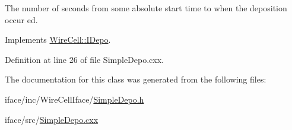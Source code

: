 The number of seconds from some absolute start time to when the deposition occur ed. 

Implements \hyperlink{class_wire_cell_1_1_i_depo_abec395a8a8335d76ae07db2baf57ed83}{Wire\+Cell\+::\+I\+Depo}.



Definition at line 26 of file Simple\+Depo.\+cxx.



The documentation for this class was generated from the following files\+:\begin{DoxyCompactItemize}
\item 
iface/inc/\+Wire\+Cell\+Iface/\hyperlink{_simple_depo_8h}{Simple\+Depo.\+h}\item 
iface/src/\hyperlink{_simple_depo_8cxx}{Simple\+Depo.\+cxx}\end{DoxyCompactItemize}
